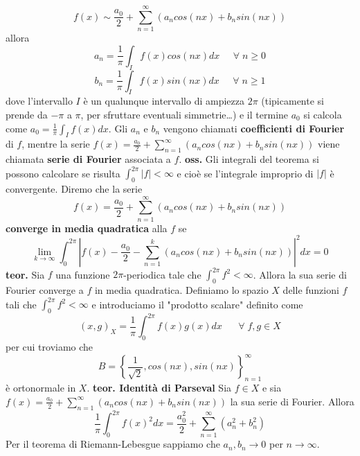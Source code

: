 \[
    f(x) \sim  \frac{a_0}{2} + \sum_{n=1}^{\infty}(a_n cos(nx) + b_n sin(nx))
\]
allora
\[
    a_n = \frac{1}{\pi} \int_{I} f(x) cos(nx) dx \;\;\;\; \;\forall\;n\geq0
\]
\[
    b_n = \frac{1}{\pi} \int_{I} f(x) sin(nx) dx \;\;\;\;\;\forall\;n\geq 1
\]
dove l'intervallo $I$ è un qualunque intervallo di ampiezza $2\pi$ (tipicamente si prende da $-\pi$ a $\pi$, per sfruttare eventuali simmetrie\dots) e il termine $a_0$ si calcola come $a_0 = \frac{1}{\pi} \int_{I} f(x) dx$.
Gli $a_n$ e $b_n$ vengono chiamati \textbf{coefficienti di Fourier} di $f$, mentre la serie $f(x) = \frac{a_0}{2} + \sum_{n=1}^{\infty}(a_n cos(nx) + b_n sin(nx))$ viene chiamata \textbf{serie di Fourier} associata a $f$.\newline
\newline
\textbf{oss.} Gli integrali del teorema si possono calcolare se risulta $\int_{0}^{2\pi}|f| < \infty$ e cioè se l'integrale improprio di $|f|$ è convergente.\newline
\newline
Diremo che la serie 
\[
    f(x) = \frac{a_0}{2} + \sum_{n=1}^{\infty}(a_n cos(nx) + b_n sin(nx))
\]
\textbf{converge in media quadratica} alla $f$ se
\[
    \lim_{k\rightarrow \infty} \int_{0}^{2\pi} \left| f(x) - \frac{a_0}{2} - \sum_{n=1}^{k}\left( a_n cos(nx) + b_n sin(nx) \right) \right|^2 dx = 0
\]
\newline
\textbf{teor.} Sia $f$ una funzione $2\pi$-periodica tale che $\int_{0}^{2\pi}f^2 < \infty$. Allora la sua serie di Fourier converge a $f$ in media quadratica.\newline
\newline
Definiamo lo spazio $X$ delle funzioni $f$ tali che $\int_{0}^{2\pi}f^2 < \infty$ e introduciamo il "prodotto scalare" definito come
\[
    (x,g)_{X} = \frac{1}{\pi}\int_{0}^{2\pi} f(x) g(x) dx \;\;\;\;\; \;\forall\;f,g \in X
\]
per cui troviamo che 
\[
    B = \left\{ \frac{1}{\sqrt{2}}, cos(nx), sin(nx) \right\}_{n=1} ^\infty
\]
è ortonormale in $X$.\newline
\newline
\textbf{teor. Identità di Parseval}\newline
Sia $f \in X$ e sia $f(x) = \frac{a_0}{2} + \sum_{n=1}^{\infty}(a_n cos(nx) + b_n sin(nx))$ la sua serie di Fourier. Allora
\[
    \frac{1}{\pi} \int_{0}^{2\pi} f(x)^2 dx = \frac{a_0^2}{2} + \sum_{n=1}^{\infty}(a_n^2 + b_n^2)
\]
Per il teorema di Riemann-Lebesgue sappiamo che $a_n, b_n \rightarrow  0$ per $n \rightarrow  \infty$.\newline
\newline
